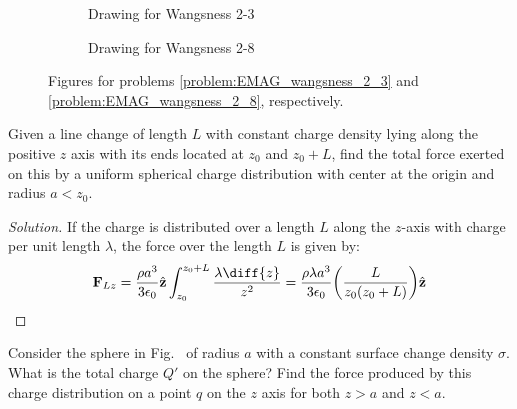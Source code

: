             \begin{figure}[H]
                \centering
                \captionsetup{type=figure}
                \begin{subfigure}[b]{0.49\textwidth}
                    \centering
                    \captionsetup{type=figure}
                    
                    \caption{Drawing for Wangsness 2-3}
                    \label{fig:EMAG_1_Wangsness_2_3}
                \end{subfigure}
                \begin{subfigure}[b]{0.49\textwidth}
                    \centering
                    \captionsetup{type=figure}
                    
                    \caption{Drawing for Wangsness 2-8}
                    \label{fig:EMAG_1_wangsness_2_8}
                \end{subfigure}
                \caption[Figures for Wangsness 2-3 and 2-8]{%
                    Figures for problems \ref{problem:EMAG_wangsness_2_3}
                    and \ref{problem:EMAG_wangsness_2_8}, respectively.
                }
            \end{figure}
            \begin{problem}[Wangsness 2-7]
                Given a line change of length $L$ with constant charge
                density lying along the positive $z$ axis with its
                ends located at $z_{0}$ and $z_{0}+L$, find the total
                force exerted on this by a uniform spherical charge
                distribution with center at the origin
                and radius $a<z_{0}$.
            \end{problem}
            \begin{proof}[Solution]
                If the charge is distributed over a length $L$
                along the $z$-axis with charge per unit length $\lambda$,
                the force over the length $L$ is given by:
                \begin{equation*}
                    \mathbf{F}_{Lz}
                    =\frac{\rho a^{3}}{3\epsilon_{0}}\hat{\mathbf{z}}
                    \int_{z_{0}}^{z_{0}+L}\frac{\lambda\diff{z}}{z^{2}}
                    =\frac{\rho\lambda{a^{3}}}{3\epsilon_{0}}
                    \bigg(\frac{L}{z_{0}(z_{0}+L)}\bigg)
                    \hat{\mathbf{z}}
                \end{equation*}
            \end{proof}
            \begin{problem}[Wangsness 2-8]
                \label{problem:EMAG_wangsness_2_8}
                Consider the sphere in
                Fig.~
                of radius $a$ with a constant surface change density
                $\sigma$. What is the total charge $Q'$ on the sphere?
                Find the force produced by this charge distribution on a
                point $q$ on the $z$ axis for both $z>a$ and $z<a$.
            \end{problem}
